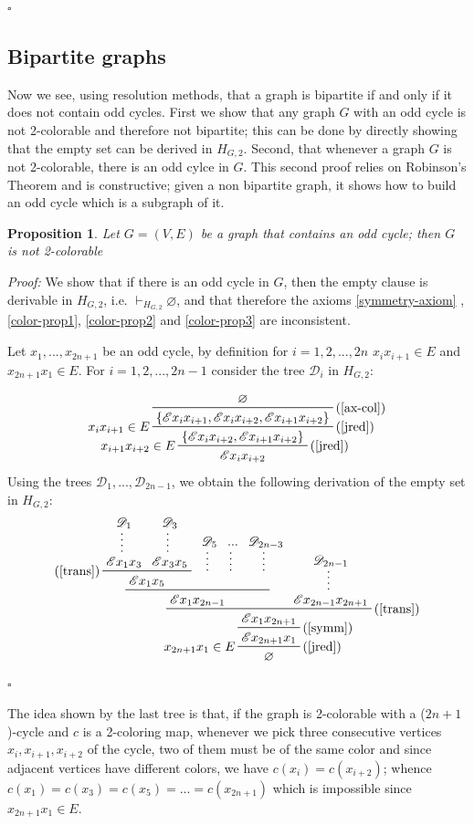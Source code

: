\documentclass[a4paper,12pt,oneside]{book}
\newtheorem{proposition}[theorem]{Proposition}
\newcommand{\E}{\mathscr{E}}
\newcommand{\D}{\mathscr{D}}
\newcommand*{\QED}{\hfill\ensuremath{\square}}
\let\emptyset\varnothing
\begin{document}
\QED


\subsection*{Bipartite graphs}
Now we see, using resolution methods, that a graph is bipartite  if and only if it does not contain odd cycles. First we show that any graph $G$ with an odd cycle is not 2-colorable and therefore not bipartite; this can be done by directly showing that the empty set can be derived in $H_{G,2}$. 
Second, that whenever a graph $G$ is not 2-colorable, there is an odd cylce in $G$. This second proof relies on Robinson's Theorem and is constructive; given a non bipartite graph, it shows how to build an odd cycle which is a subgraph of it. 

\begin{proposition}
Let $G=(V,E)$ be a graph that contains an odd cycle; then $G$ is not 2-colorable 
\end{proposition}
\textit{Proof:}
We show that if there is an odd cycle in $G$, then the empty clause is derivable in $H_ {G,2}$, i.e. $\vdash_{H_{G,2}} \emptyset$, and that therefore the axioms \ref{symmetry-axiom} ,\ref{color-prop1}, \ref{color-prop2} and \ref{color-prop3} are inconsistent.

Let $x_1, ..., x_{2n+1} $ be an odd cycle, by definition for $i=1,2,..., 2n$ $x_i x_{i+1} \in E$ and $ x_{2n+1} x_1 \in E$. For $i=1,2,...,2n-1$ consider the tree $\D_i$ in $H_{G,2}$:

$$
\prftree[r,l]{(\ref{jred})}{$x_{i+1} x_{i+2} \in E$}{
\prftree[r,l]{(\ref{jred})}{$x_i x_{i+1} \in E$} 
{ \prftree[r]{(\ref{ax-col})}{\emptyset}
{\{\E x_i x_{i+1} , \E x_{i} x_{i+2} , \E x_{i+1} x_{i+2}\}}}
{\{ \E x_{i} x_{i+2} , \E x_{i+1} x_{i+2}  \}}
}
{\E x_i x_{i+2}}
$$
\newpage Using the trees $\D_1,...,\D_{2n-1}$, we obtain the following derivation of the empty set in $H_{G,2}$:
$$
\prftree[r,l]{(\ref{jred})}{$x_{2n+1}x_1\in E$}
{ \prftree[r]{(\ref{symm})}
{\prftree[r]{(\ref{trans})} 
{\prftree{ \prftree[l]{(\ref{trans})}{ \prfsummary{\D_1} {\E x_1x_3}  }{  \prfsummary{\D_3}{\E x_3x_5} }
{\E x_1 x_5}}{\prfsummary{ \D_5}{ }}{ \prfsummary{...}{} }{\prfsummary{ \D_{2n-3}}{ }}
{ \E x_1 x_{2n-1}}}{\prfsummary{\D_{2n-1}} { \E x_{2n-1}x_{2n+1}}}
{\E x_1 x_{2n+1} } }  
{\E x_{2n+1}x_1} }
{\emptyset}
$$
\QED

The idea shown by the last tree is that, if the graph is 2-colorable with a ($2n+1$)-cycle and $c$ is a 2-coloring map, whenever we pick three consecutive vertices $x_i,x_{i+1},x_{i+2}$ of the cycle, two of them must be of the same color and since adjacent vertices have different colors, we have $c(x_i)=c(x_{i+2})$; whence $c(x_1)=c(x_3)=c(x_5)=...=c(x_{2n+1})$ which is impossible since $x_{2n+1}x_1 \in E$.
\end{document}

